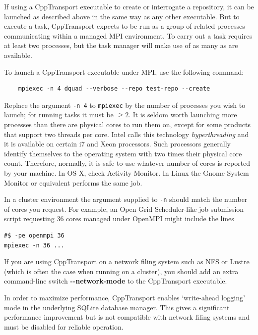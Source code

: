 \documentclass[11pt,a4paper]{article}
\newenvironment{warning}{\begin{tcolorbox}[enhanced,breakable,colback=red!10,colbacktitle=red!20,colframe=red!40,coltitle=black,title={Warning},fonttitle=\sffamily\fontseries{b}\selectfont]}{\end{tcolorbox}}
\newcommand{\packagefont}{\sffamily}
\newcommand{\CppTransport}{{\packagefont CppTransport}}
\newcommand{\MPI}{{\packagefont MPI}}
\newcommand{\OpenMPI}{{\packagefont OpenMPI}}
\newcommand{\SQLite}{{\packagefont SQLite}}
\newcommand{\option}[1]{{\ttfamily\bfseries\small #1}}
\newcommand{\semibold}[1]{{\fontseries{b}\selectfont{#1}}}
\newcommand{\para}[1]{\par\vspace{2mm}\noindent\semibold{{#1.}---}\ignorespaces}
\renewcommand{\geq}{\geqslant}
\begin{document}
\para{Launching {\CppTransport} using MPI}
If using a {\CppTransport} executable to create or
interrogate a repository, it can be launched as described above
in the same way as any other executable.
But to execute a task, {\CppTransport} expects to be run as a group
of related processes communicating within a managed {\MPI}
environment.
To carry out a task requires at least two processes,
but the task manager will make use of as many as are available.

To launch a {\CppTransport} executable under {\MPI},
use the following command:
\begin{verbatim}
    mpiexec -n 4 dquad --verbose --repo test-repo --create
\end{verbatim}
Replace the argument
\texttt{-n 4} to \texttt{mpiexec}
by the number of processes you wish to launch;
for running tasks it must be $\geq 2$.
It is seldom worth launching more processes than
there are physical cores to run them on,
except for some 
products that support two
threads per core.
Intel calls this technology \emph{hyperthreading}
and it is available on certain i7 and Xeon
processors.
Such processors generally
identify themselves to the operating system with
two times their
physical core count.
Therefore, normally,
it is safe to use whatever number of
cores is reported by your machine.
In OS X, check Activity Monitor.
In Linux the Gnome System Monitor or equivalent performs
the same job.

In a cluster environment the argument
supplied to
\texttt{-n} should match the number of
cores you request.
For example, an Open Grid Scheduler-like job submission
script requesting 36 cores
managed under {\OpenMPI}
might include the lines
\begin{verbatim}
#$ -pe openmpi 36
mpiexec -n 36 ...
\end{verbatim}
\begin{warning}
    If you are using {\CppTransport} on a network filing system
    such as NFS or Lustre (which is often the case when running on a cluster),
    you should add an extra command-line
    switch \option{{-}{-}network-mode}
    to the {\CppTransport} executable.
    
    In order to maximize performance, {\CppTransport}
    enables `write-ahead logging' mode in the underlying
    {\SQLite} database manager.
    This gives a significant performance improvement but is
    not compatible with network filing systems
    and must be disabled for reliable operation.
\end{warning}
\end{document}
